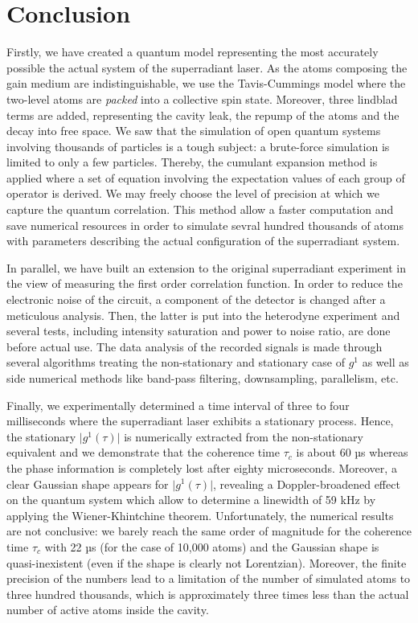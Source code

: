 \documentclass[11pt]{report}
\begin{document}
\chapter{Conclusion}

Firstly, we have created a quantum model representing the most accurately possible the actual system of the superradiant laser. As the atoms composing the gain medium are indistinguishable, we use the Tavis-Cummings model where the two-level atoms are \textit{packed} into a collective spin state. Moreover, three lindblad terms are added, representing the cavity leak, the repump of the atoms and the decay into free space. We saw that the simulation of open quantum systems involving thousands of particles is a tough subject: a brute-force simulation is limited to only a few particles. Thereby, the cumulant expansion method is applied where a set of equation involving the expectation values of each group of operator is derived. We may freely choose the level of precision at which we capture the quantum correlation. This method allow a faster computation and save numerical resources in order to simulate sevral hundred thousands of atoms with parameters describing the actual configuration of the superradiant system.

In parallel, we have built an extension to the original superradiant experiment in the view of measuring the first order correlation function. In order to reduce the electronic noise of the circuit, a component of the detector is changed after a meticulous analysis. Then, the latter is put into the heterodyne experiment and several tests, including intensity saturation and power to noise ratio, are done before actual use. The data analysis of the recorded signals is made through several algorithms treating the non-stationary and stationary case of $g^1$ as well as side numerical methods like band-pass filtering, downsampling, parallelism, etc.

Finally, we experimentally determined a time interval of three to four milliseconds where the superradiant laser exhibits a stationary process. Hence, the stationary $\vert g^1(\tau) \vert$ is numerically extracted from the non-stationary equivalent and we demonstrate that the coherence time $\tau_c$ is about 60 µs whereas the phase information is completely lost after eighty microseconds. Moreover, a clear Gaussian shape appears for $\vert g^1(\tau) \vert$, revealing a Doppler-broadened effect on the quantum system which allow to determine a linewidth of 59 kHz by applying the Wiener-Khintchine theorem. Unfortunately, the numerical results are not conclusive: we barely reach the same order of magnitude for the coherence time $\tau_c$ with 22 µs (for the case of 10,000 atoms) and the Gaussian shape is quasi-inexistent (even if the shape is clearly not Lorentzian). Moreover, the finite precision of the numbers lead to a limitation of the number of simulated atoms to three hundred thousands, which is approximately three times less than the actual number of active atoms inside the cavity.
\end{document}

